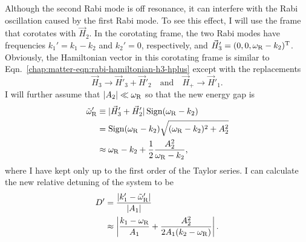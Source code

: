 Although the second Rabi mode is off resonance, it can interfere with the Rabi oscillation caused by the first Rabi mode.
To see this effect, I will use the frame that corotates with $\vec H_2$. In the corotating frame, the two Rabi modes have frequencies $k_1'=k_1-k_2$ and $k_2'=0$, respectively, and $\vec H'_3 = ( 0,0, \omega_{\mathrm R}- k_2 )^{\mathrm{T}}$. Obviously, the Hamiltonian vector in this corotating frame is similar to Eqn.~\eqref{chap:matter-eqn:rabi-hamiltonian-h3-hplus} except with the replacements
\begin{equation}
    \vec H_3 \to \vec H'_3 + \vec H'_2  \quad \text{and} \quad \vec H_+ \to \vec H'_1.
\end{equation}
I will further assume that $\lvert A_2\rvert \ll \omega_\mathrm R$ so that the new energy gap is
\begin{align}
    \tilde\omega_{\mathrm{R}}' &\equiv \lvert \vec H'_3 + \vec H'_2 \rvert \Sign (\omega_\RR - k_2) \nonumber\\
    &= \Sign (\omega_{\RR}- k_2 ) \sqrt{ (\omega_{\RR}- k_2 )^2 + A_2^2 } \nonumber\\
    &\approx \omega_{\mathrm R} - k_2 + \frac{1}{2}\frac{A_2^2}{\omega_{\mathrm R} - k_2},
    \label{eq-new-energy-gap-due-to-second-mode-approximation}
\end{align}
where I have kept only up to the first order of the Taylor series. I can calculate the new relative detuning of the system to be
\begin{align}
    \RD' &= \frac{\lvert k_1' - \tilde \omega_{\mathrm R}' \rvert}{\lvert A_1 \rvert}\nonumber\\
    &\approx \left \lvert \frac{ k_1-\omega_{\mathrm R}}{ A_1} + \frac{ A_2^2 }{2  A_1 ( k_2 - \omega_{\mathrm R})} \right  \rvert.
    \label{app:chap:matter-eq:relative-detuning-changed}
\end{align}
